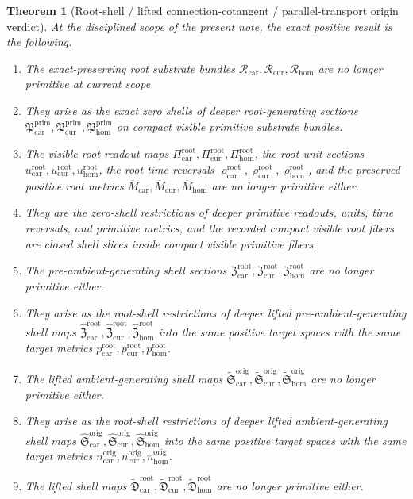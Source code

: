 \documentclass[11pt]{article}
\newcommand{\TensorOriginTargetMetric}{n_{\mathrm{car}}^{\mathrm{orig}}}
\newcommand{\CurOriginTargetMetric}{n_{\mathrm{cur}}^{\mathrm{orig}}}
\newcommand{\HomOriginTargetMetric}{n_{\mathrm{hom}}^{\mathrm{orig}}}
\newcommand{\TensorRootSpace}{\mathcal R_{\mathrm{car}}}
\newcommand{\CurRootSpace}{\mathcal R_{\mathrm{cur}}}
\newcommand{\HomRootSpace}{\mathcal R_{\mathrm{hom}}}
\newcommand{\TensorRootRead}{\Pi_{\mathrm{car}}^{\mathrm{root}}}
\newcommand{\CurRootRead}{\Pi_{\mathrm{cur}}^{\mathrm{root}}}
\newcommand{\HomRootRead}{\Pi_{\mathrm{hom}}^{\mathrm{root}}}
\newcommand{\TensorRootUnit}{u_{\mathrm{car}}^{\mathrm{root}}}
\newcommand{\CurRootUnit}{u_{\mathrm{cur}}^{\mathrm{root}}}
\newcommand{\HomRootUnit}{u_{\mathrm{hom}}^{\mathrm{root}}}
\newcommand{\TensorRootTimeRev}{\varrho_{\mathrm{car}}^{\mathrm{root}}}
\newcommand{\CurRootTimeRev}{\varrho_{\mathrm{cur}}^{\mathrm{root}}}
\newcommand{\HomRootTimeRev}{\varrho_{\mathrm{hom}}^{\mathrm{root}}}
\newcommand{\TensorRootSpaceMetric}{\overline M_{\mathrm{car}}}
\newcommand{\CurRootSpaceMetric}{\overline M_{\mathrm{cur}}}
\newcommand{\HomRootSpaceMetric}{\overline M_{\mathrm{hom}}}
\newcommand{\TensorRootTargetMetric}{p_{\mathrm{car}}^{\mathrm{root}}}
\newcommand{\CurRootTargetMetric}{p_{\mathrm{cur}}^{\mathrm{root}}}
\newcommand{\HomRootTargetMetric}{p_{\mathrm{hom}}^{\mathrm{root}}}
\newcommand{\TensorRootSection}{\mathfrak Z_{\mathrm{car}}^{\mathrm{root}}}
\newcommand{\CurRootSection}{\mathfrak Z_{\mathrm{cur}}^{\mathrm{root}}}
\newcommand{\HomRootSection}{\mathfrak Z_{\mathrm{hom}}^{\mathrm{root}}}
\newcommand{\TensorLiftedAmbientSection}{\widetilde{\mathfrak S}_{\mathrm{car}}^{\mathrm{orig}}}
\newcommand{\CurLiftedAmbientSection}{\widetilde{\mathfrak S}_{\mathrm{cur}}^{\mathrm{orig}}}
\newcommand{\HomLiftedAmbientSection}{\widetilde{\mathfrak S}_{\mathrm{hom}}^{\mathrm{orig}}}
\newcommand{\TensorRootLiftedShellSection}{\widetilde{\mathfrak D}_{\mathrm{car}}^{\mathrm{root}}}
\newcommand{\CurRootLiftedShellSection}{\widetilde{\mathfrak D}_{\mathrm{cur}}^{\mathrm{root}}}
\newcommand{\HomRootLiftedShellSection}{\widetilde{\mathfrak D}_{\mathrm{hom}}^{\mathrm{root}}}
\newcommand{\TensorPrimitiveSection}{\mathfrak P_{\mathrm{car}}^{\mathrm{prim}}}
\newcommand{\CurPrimitiveSection}{\mathfrak P_{\mathrm{cur}}^{\mathrm{prim}}}
\newcommand{\HomPrimitiveSection}{\mathfrak P_{\mathrm{hom}}^{\mathrm{prim}}}
\newcommand{\TensorPrimitiveLiftedPreAmbientSection}{\widehat{\mathfrak Z}_{\mathrm{car}}^{\mathrm{root}}}
\newcommand{\CurPrimitiveLiftedPreAmbientSection}{\widehat{\mathfrak Z}_{\mathrm{cur}}^{\mathrm{root}}}
\newcommand{\HomPrimitiveLiftedPreAmbientSection}{\widehat{\mathfrak Z}_{\mathrm{hom}}^{\mathrm{root}}}
\newcommand{\TensorPrimitiveLiftedAmbientSection}{\widehat{\mathfrak S}_{\mathrm{car}}^{\mathrm{orig}}}
\newcommand{\CurPrimitiveLiftedAmbientSection}{\widehat{\mathfrak S}_{\mathrm{cur}}^{\mathrm{orig}}}
\newcommand{\HomPrimitiveLiftedAmbientSection}{\widehat{\mathfrak S}_{\mathrm{hom}}^{\mathrm{orig}}}
\newtheorem{theorem}{Theorem}
\begin{document}
\begin{theorem}[Root-shell / lifted connection-cotangent / parallel-transport origin verdict]
\label{thm:verdict}
At the disciplined scope of the present note, the exact positive result is the following.
\begin{enumerate}
    \item The exact-preserving root substrate bundles \(\TensorRootSpace,\CurRootSpace,\HomRootSpace\) are no longer primitive at current scope.
    \item They arise as the exact zero shells of deeper root-generating sections \(\TensorPrimitiveSection,\CurPrimitiveSection,\HomPrimitiveSection\) on compact visible primitive substrate bundles.
    \item The visible root readout maps \(\TensorRootRead,\CurRootRead,\HomRootRead\), the root unit sections \(\TensorRootUnit,\CurRootUnit,\HomRootUnit\), the root time reversals \(\TensorRootTimeRev,\CurRootTimeRev,\HomRootTimeRev\), and the preserved positive root metrics \(\TensorRootSpaceMetric,\CurRootSpaceMetric,\HomRootSpaceMetric\) are no longer primitive either.
    \item They are the zero-shell restrictions of deeper primitive readouts, units, time reversals, and primitive metrics, and the recorded compact visible root fibers are closed shell slices inside compact visible primitive fibers.
    \item The pre-ambient-generating shell sections \(\TensorRootSection,\CurRootSection,\HomRootSection\) are no longer primitive either.
    \item They arise as the root-shell restrictions of deeper lifted pre-ambient-generating shell maps \(\TensorPrimitiveLiftedPreAmbientSection,\CurPrimitiveLiftedPreAmbientSection,\HomPrimitiveLiftedPreAmbientSection\) into the same positive target spaces with the same target metrics \(\TensorRootTargetMetric,\CurRootTargetMetric,\HomRootTargetMetric\).
    \item The lifted ambient-generating shell maps \(\TensorLiftedAmbientSection,\CurLiftedAmbientSection,\HomLiftedAmbientSection\) are no longer primitive either.
    \item They arise as the root-shell restrictions of deeper lifted ambient-generating shell maps \(\TensorPrimitiveLiftedAmbientSection,\CurPrimitiveLiftedAmbientSection,\HomPrimitiveLiftedAmbientSection\) into the same positive target spaces with the same target metrics \(\TensorOriginTargetMetric,\CurOriginTargetMetric,\HomOriginTargetMetric\).
    \item The lifted shell maps \(\TensorRootLiftedShellSection,\CurRootLiftedShellSection,\HomRootLiftedShellSection\) are no longer primitive either.

\end{enumerate}
\end{theorem}
\end{document}
